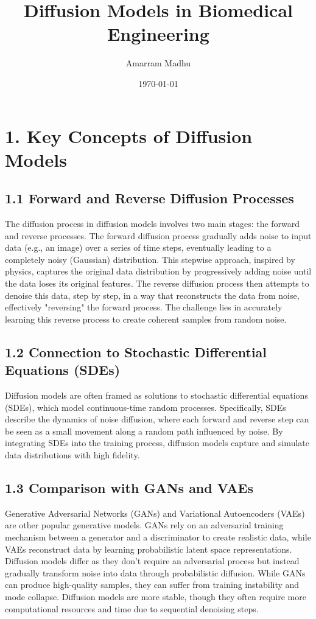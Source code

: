 \documentclass[12pt]{article}
\title{Diffusion Models in Biomedical Engineering}
\author{Amarram Madhu}
\date{\today}
\begin{document}
\maketitle

\section*{1. Key Concepts of Diffusion Models}

\subsection*{1.1 Forward and Reverse Diffusion Processes}
The diffusion process in diffusion models involves two main stages: the forward and reverse processes. The forward diffusion process gradually adds noise to input data (e.g., an image) over a series of time steps, eventually leading to a completely noisy (Gaussian) distribution. This stepwise approach, inspired by physics, captures the original data distribution by progressively adding noise until the data loses its original features. The reverse diffusion process then attempts to denoise this data, step by step, in a way that reconstructs the data from noise, effectively "reversing" the forward process. The challenge lies in accurately learning this reverse process to create coherent samples from random noise.

\subsection*{1.2 Connection to Stochastic Differential Equations (SDEs)}
Diffusion models are often framed as solutions to stochastic differential equations (SDEs), which model continuous-time random processes. Specifically, SDEs describe the dynamics of noise diffusion, where each forward and reverse step can be seen as a small movement along a random path influenced by noise. By integrating SDEs into the training process, diffusion models capture and simulate data distributions with high fidelity.

\subsection*{1.3 Comparison with GANs and VAEs}
Generative Adversarial Networks (GANs) and Variational Autoencoders (VAEs) are other popular generative models. GANs rely on an adversarial training mechanism between a generator and a discriminator to create realistic data, while VAEs reconstruct data by learning probabilistic latent space representations. Diffusion models differ as they don’t require an adversarial process but instead gradually transform noise into data through probabilistic diffusion. While GANs can produce high-quality samples, they can suffer from training instability and mode collapse. Diffusion models are more stable, though they often require more computational resources and time due to sequential denoising steps.
\end{document}
